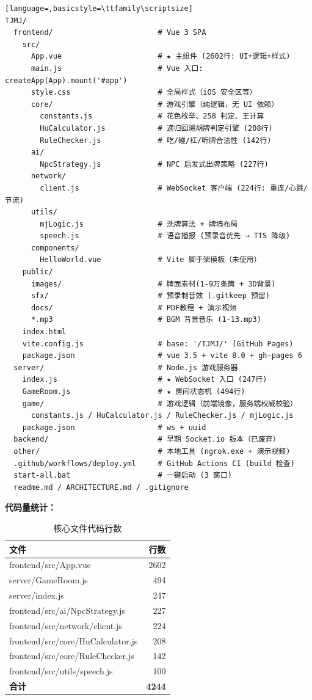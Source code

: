 \documentclass[11pt,a4paper]{article}
\begin{document}
\begin{lstlisting}[language=,basicstyle=\ttfamily\scriptsize]
TJMJ/
  frontend/                        # Vue 3 SPA
    src/
      App.vue                      # ★ 主组件 (2602行: UI+逻辑+样式)
      main.js                      # Vue 入口: createApp(App).mount('#app')
      style.css                    # 全局样式（iOS 安全区等）
      core/                        # 游戏引擎（纯逻辑，无 UI 依赖）
        constants.js               # 花色枚举、258 判定、王计算
        HuCalculator.js            # 递归回溯胡牌判定引擎 (208行)
        RuleChecker.js             # 吃/碰/杠/听牌合法性 (142行)
      ai/
        NpcStrategy.js             # NPC 启发式出牌策略 (227行)
      network/
        client.js                  # WebSocket 客户端 (224行: 重连/心跳/节流)
      utils/
        mjLogic.js                 # 洗牌算法 + 牌墙布局
        speech.js                  # 语音播报 (预录音优先 → TTS 降级)
      components/
        HelloWorld.vue             # Vite 脚手架模板（未使用）
    public/
      images/                      # 牌面素材(1-9万条筒 + 3D背景)
      sfx/                         # 预录制音效 (.gitkeep 预留)
      docs/                        # PDF教程 + 演示视频
      *.mp3                        # BGM 背景音乐 (1-13.mp3)
    index.html
    vite.config.js                 # base: '/TJMJ/' (GitHub Pages)
    package.json                   # vue 3.5 + vite 8.0 + gh-pages 6
  server/                          # Node.js 游戏服务器
    index.js                       # ★ WebSocket 入口 (247行)
    GameRoom.js                    # ★ 房间状态机 (494行)
    game/                          # 游戏逻辑（前端镜像，服务端权威校验）
      constants.js / HuCalculator.js / RuleChecker.js / mjLogic.js
    package.json                   # ws + uuid
  backend/                         # 早期 Socket.io 版本（已废弃）
  other/                           # 本地工具 (ngrok.exe + 演示视频)
  .github/workflows/deploy.yml     # GitHub Actions CI (build 检查)
  start-all.bat                    # 一键启动 (3 窗口)
  readme.md / ARCHITECTURE.md / .gitignore
\end{lstlisting}

\textbf{代码量统计：}

\begin{table}[H]
\centering
\caption{核心文件代码行数}
\label{tab:loc}
\small
\begin{tabular}{@{}lr@{}}
\toprule
\textbf{文件} & \textbf{行数} \\
\midrule
frontend/src/App.vue & 2602 \\
server/GameRoom.js & 494 \\
server/index.js & 247 \\
frontend/src/ai/NpcStrategy.js & 227 \\
frontend/src/network/client.js & 224 \\
frontend/src/core/HuCalculator.js & 208 \\
frontend/src/core/RuleChecker.js & 142 \\
frontend/src/utils/speech.js & 100 \\
\midrule
\textbf{合计} & \textbf{4244} \\
\bottomrule
\end{tabular}
\end{table}
\end{document}
